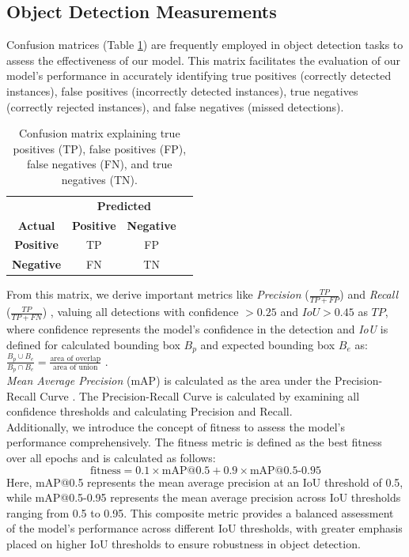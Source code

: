 \documentclass[sigchi,screen]{acmart}
\begin{document}
\subsection{Object Detection Measurements}

Confusion matrices (Table \ref{tab:confusion_matrix}) are frequently employed in object detection tasks to assess the effectiveness of our model. This matrix facilitates the evaluation of our model's performance in accurately identifying true positives (correctly detected instances), false positives (incorrectly detected instances), true negatives (correctly rejected instances), and false negatives (missed detections).

\begin{table}[htbp]
  \centering
  \begin{tabular}{@{}cccc@{}}
    & \multicolumn{2}{c}{\textbf{Predicted}} \\ \cmidrule(l){2-3} 
    \textbf{Actual} & \textbf{Positive} & \textbf{Negative} \\ \midrule
    \textbf{Positive} & TP & FP \\
    \textbf{Negative} & FN & TN \\ \bottomrule
  \end{tabular}
  \caption{Confusion matrix explaining true positives (TP), false positives (FP), false negatives (FN), and true negatives (TN).}
  \label{tab:confusion_matrix}
\end{table}
From this matrix, we derive important metrics like \textit{Precision} ($\frac{TP}{TP +FP}$) and \textit{Recall} ($\frac{TP}{TP +FN}$) \citep{aghdam2017guide}, valuing all detections with confidence $>0.25$ and $IoU > 0.45$ as $TP$, where confidence represents the model's confidence in the detection and \textit{IoU} is defined for calculated bounding box $B_p$ and expected bounding box $B_e$ as: $\frac{B_p \cup B_e}{B_p \cap B_e} = \frac{\text{area of overlap}}{\text{area of union}}$ \citep{szeliski2022computer}. \\
\textit{Mean Average Precision} (mAP) is calculated as the area under the Precision-Recall Curve \citep{everingham2010pascal}. The Precision-Recall Curve is calculated by examining all confidence thresholds and calculating Precision and Recall. \\
Additionally, we introduce the concept of fitness to assess the model's performance comprehensively. The fitness metric is defined as the best fitness over all epochs and is calculated as follows:
\[ \text{fitness} = 0.1 \times \text{mAP@0.5} + 0.9 \times \text{mAP@0.5-0.95} \] Here, mAP@0.5 represents the mean average precision at an IoU threshold of 0.5, while mAP@0.5-0.95 represents the mean average precision across IoU thresholds ranging from 0.5 to 0.95. This composite metric provides a balanced assessment of the model's performance across different IoU thresholds, with greater emphasis placed on higher IoU thresholds to ensure robustness in object detection.
\end{document}
